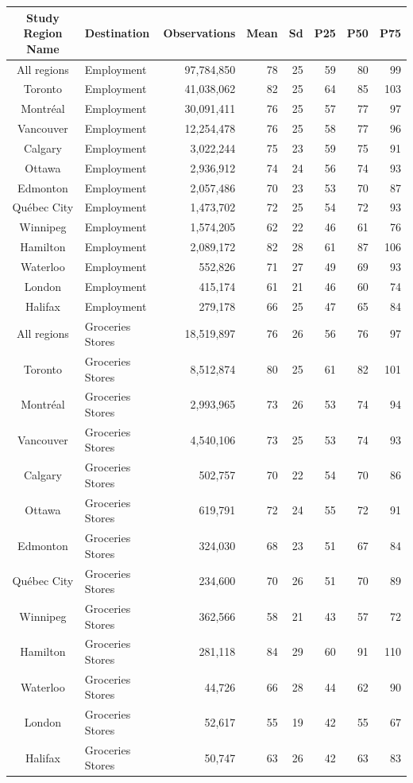 \documentclass[Royal,times,sageh]{sagej}
\begin{document}
\begin{table}[!t]
\fontsize{7.5pt}{9.0pt}\selectfont
\begin{tabular*}{1\linewidth}{@{\extracolsep{\fill}}clrrrrrr}
\toprule
Study Region Name & Destination & Observations & Mean & Sd & P25 & P50 & P75 \\ 
\midrule\addlinespace[2.5pt]
All regions & Employment & 97,784,850 & 78 & 25 & 59 & 80 & 99 \\ 
Toronto & Employment & 41,038,062 & 82 & 25 & 64 & 85 & 103 \\ 
Montréal & Employment & 30,091,411 & 76 & 25 & 57 & 77 & 97 \\ 
Vancouver & Employment & 12,254,478 & 76 & 25 & 58 & 77 & 96 \\ 
Calgary & Employment & 3,022,244 & 75 & 23 & 59 & 75 & 91 \\ 
Ottawa & Employment & 2,936,912 & 74 & 24 & 56 & 74 & 93 \\ 
Edmonton & Employment & 2,057,486 & 70 & 23 & 53 & 70 & 87 \\ 
Québec City & Employment & 1,473,702 & 72 & 25 & 54 & 72 & 93 \\ 
Winnipeg & Employment & 1,574,205 & 62 & 22 & 46 & 61 & 76 \\ 
Hamilton & Employment & 2,089,172 & 82 & 28 & 61 & 87 & 106 \\ 
Waterloo & Employment & 552,826 & 71 & 27 & 49 & 69 & 93 \\ 
London & Employment & 415,174 & 61 & 21 & 46 & 60 & 74 \\ 
Halifax & Employment & 279,178 & 66 & 25 & 47 & 65 & 84 \\ 
All regions & Groceries Stores & 18,519,897 & 76 & 26 & 56 & 76 & 97 \\ 
Toronto & Groceries Stores & 8,512,874 & 80 & 25 & 61 & 82 & 101 \\ 
Montréal & Groceries Stores & 2,993,965 & 73 & 26 & 53 & 74 & 94 \\ 
Vancouver & Groceries Stores & 4,540,106 & 73 & 25 & 53 & 74 & 93 \\ 
Calgary & Groceries Stores & 502,757 & 70 & 22 & 54 & 70 & 86 \\ 
Ottawa & Groceries Stores & 619,791 & 72 & 24 & 55 & 72 & 91 \\ 
Edmonton & Groceries Stores & 324,030 & 68 & 23 & 51 & 67 & 84 \\ 
Québec City & Groceries Stores & 234,600 & 70 & 26 & 51 & 70 & 89 \\ 
Winnipeg & Groceries Stores & 362,566 & 58 & 21 & 43 & 57 & 72 \\ 
Hamilton & Groceries Stores & 281,118 & 84 & 29 & 60 & 91 & 110 \\ 
Waterloo & Groceries Stores & 44,726 & 66 & 28 & 44 & 62 & 90 \\ 
London & Groceries Stores & 52,617 & 55 & 19 & 42 & 55 & 67 \\ 
Halifax & Groceries Stores & 50,747 & 63 & 26 & 42 & 63 & 83 \\ 
\bottomrule
\end{tabular*}
\end{table}
\end{document}

